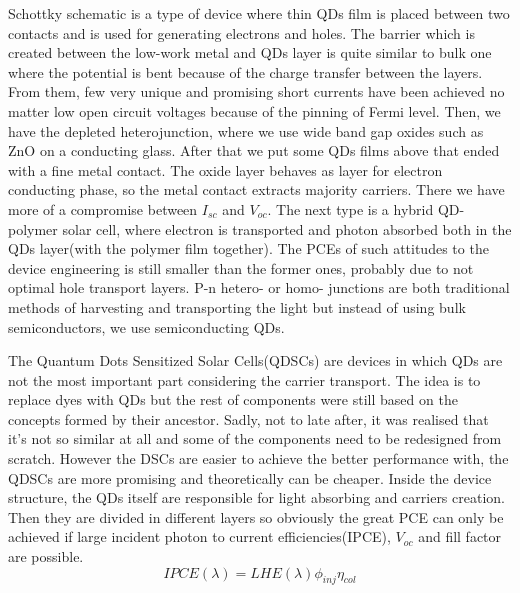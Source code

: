 Schottky schematic is a type of device where thin QDs film is placed between two contacts and is used for generating electrons and holes. The barrier which is created between the low-work metal and QDs layer is quite similar to bulk one where the potential is bent because of the charge transfer between the layers. From them, few very unique and promising short currents have been achieved no matter low open circuit voltages because of the pinning of Fermi level. Then, we have the depleted heterojunction, where we use wide band gap oxides such as ZnO on a conducting glass. After that we put some QDs films above that ended with a fine metal contact. The oxide layer behaves as layer for electron conducting phase, so the metal contact extracts majority carriers. There we have more of a compromise between $I_{sc}$ and $V_{oc}$.  The next type is a hybrid QD-polymer solar cell, where electron is transported and photon absorbed both in the QDs layer(with the polymer film together). The PCEs of such attitudes to the device engineering is still smaller than the former ones, probably due to not optimal hole transport layers. P-n hetero- or homo- junctions are both traditional methods of harvesting and transporting the light but instead of using bulk semiconductors, we use semiconducting QDs. 

The Quantum Dots Sensitized Solar Cells(QDSCs) are devices in which QDs are not the most important part considering the carrier transport. The idea is to replace dyes with QDs but the rest of components were still based on the concepts formed by their ancestor. Sadly, not to late after, it was realised that it's not so similar at all and some of the components need to be redesigned from scratch. However the DSCs are easier to achieve the better performance with, the QDSCs are more promising and theoretically can be cheaper. Inside the device structure, the QDs itself are responsible for light absorbing and carriers creation. Then they are divided in different layers so obviously the great PCE can only be achieved if large incident photon to current efficiencies(IPCE), $V_{oc}$ and fill factor are possible. 
\begin{equation}
IPCE(\lambda ) = LHE(\lambda ) \phi_{inj} \eta_{col}
\end{equation}

